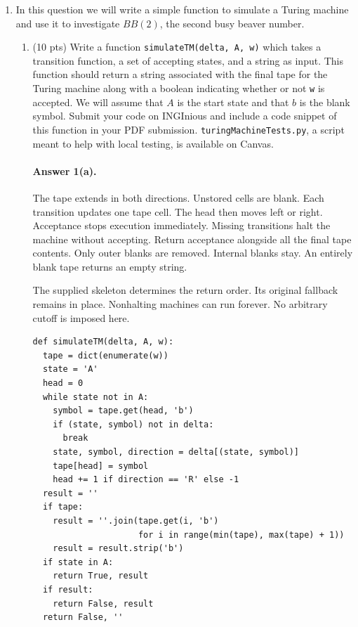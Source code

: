 \documentclass{article}
\begin{document}
\begin{enumerate}

    \item In this question we will write a simple function to simulate a Turing machine and use it to investigate $BB(2)$, the second busy beaver number.
    \begin{enumerate}
        \item (10 pts) Write a function \verb|simulateTM(delta, A, w)| which takes a transition function, a set of accepting states, and a string as input. This function should return a string associated with the final tape for the Turing machine along with a boolean indicating whether or not \verb|w| is accepted. We will assume that $A$ is the start state and that $b$ is the blank symbol. Submit your code on INGInious and include a code snippet of this function in your PDF submission. \verb|turingMachineTests.py|, a script meant to help with local testing, is available on Canvas.


\paragraph{Answer 1(a).}\mbox{}\par
The tape extends in both directions.
Unstored cells are blank.
Each transition updates one tape cell.
The head then moves left or right.
Acceptance stops execution immediately.
Missing transitions halt the machine without accepting.
Return acceptance alongside all the final tape contents.
Only outer blanks are removed.
Internal blanks stay.
An entirely blank tape returns an empty string.

The supplied skeleton determines the return order.
Its original fallback remains in place.
Nonhalting machines can run forever.
No arbitrary cutoff is imposed here.

\par\noindent\begin{minipage}{\linewidth}
\begin{lstlisting}
def simulateTM(delta, A, w):
  tape = dict(enumerate(w))
  state = 'A'
  head = 0
  while state not in A:
    symbol = tape.get(head, 'b')
    if (state, symbol) not in delta:
      break
    state, symbol, direction = delta[(state, symbol)]
    tape[head] = symbol
    head += 1 if direction == 'R' else -1
  result = ''
  if tape:
    result = ''.join(tape.get(i, 'b')
                     for i in range(min(tape), max(tape) + 1))
    result = result.strip('b')
  if state in A:
    return True, result
  if result:
    return False, result
  return False, ''
\end{lstlisting}
\end{minipage}\par


\end{enumerate}
\end{enumerate}
\end{document}
